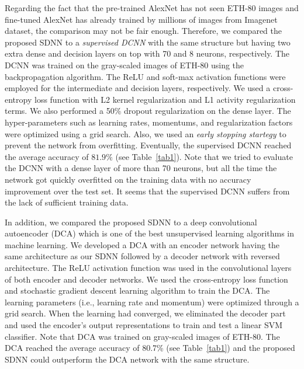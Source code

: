 \documentclass[preprint,5p,12pt,twocolumn]{article}
\begin{document}
Regarding the fact that the pre-trained AlexNet has not seen ETH-80 images and fine-tuned AlexNet has already trained by millions of images from Imagenet dataset, the comparison may not be fair enough. Therefore, we compared the proposed SDNN to a \textit{supervised DCNN} with the same structure but having two extra dense and decision layers on top with 70 and 8 neurons, respectively. The DCNN was trained on the gray-scaled images of ETH-80 using the backpropagation algorithm. The ReLU and soft-max activation functions were employed for the intermediate and decision layers, respectively. We used a cross-entropy loss function with L2 kernel regularization and L1 activity regularization terms. We also performed a 50\% dropout regularization on the dense layer. The hyper-parameters such as learning rates, momentums, and regularization factors were optimized using a grid search. Also, we used an \textit{early stopping startegy} to prevent the network from overfitting. Eventually, the supervised DCNN reached the average accuracy of $81.9\%$ (see Table~\ref{tab1}). Note that we tried to evaluate the DCNN with a dense layer of more than 70 neurons, but all the time the network got quickly  overfitted on the training data with no accuracy improvement over the test set. It seems that the supervised DCNN suffers from the lack of sufficient training data.


In addition, we compared the proposed SDNN to a deep convolutional autoencoder (DCA) which is one of the best unsupervised learning algorithms in machine learning. We developed a DCA with an encoder network having the same architecture as our SDNN followed by a decoder network with reversed architecture. The ReLU activation function was used in the convolutional layers of both encoder and decoder networks. We used the cross-entropy loss function and stochastic gradient descent learning algorithm to train the DCA. The learning parameters (i.e., learning rate and momentum) were optimized through a grid search. When the learning had converged, we eliminated the decoder part and used the encoder's output representations to train and test a linear SVM classifier. Note that DCA was trained on gray-scaled images of ETH-80. The DCA reached the average accuracy of 80.7\% (see Table~\ref{tab1}) and the proposed SDNN could outperform the DCA network with the same structure.

\end{document}
